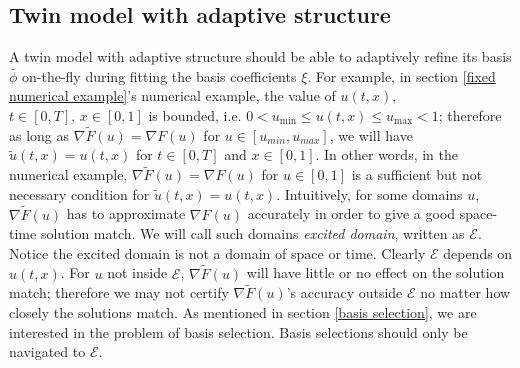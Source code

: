 \documentclass[a4paper,onecolumn]{article}
\theoremstyle{remark}
\begin{document}
\subsection{Twin model with adaptive structure}
\label{adaptive}
A twin model with adaptive structure should be able to adaptively
refine its basis $\bar{\phi}$ on-the-fly during fitting the basis coefficients $\xi$.
For example, in section \ref{fixed numerical example}'s numerical example,
the value of $u(t,x)$, $t\in[0,T],\,x\in[0,1]$ is bounded, i.e.
$0< u_{\min}\le u(t,x)\le u_{\max} < 1$; therefore as long as 
$\nabla\tilde{F}(u) = \nabla F(u)$ for $u\in[u_{min},u_{max}]$, we will have
$\tilde{u}(t,x) = u(t,x)$ for $t\in[0,T]$ and $x\in[0,1]$.
In other words, in the numerical example, $\nabla \tilde{F}(u) = \nabla F(u)$ for $u\in [0,1]$
is a sufficient but not necessary condition
for $\tilde{u}(t,x) = u(t,x)$. 
Intuitively, for some domains $u$, $\nabla \tilde{F}(u)$ has to approximate $\nabla F(u)$
accurately in order to give a good space-time solution match.
We will call such domains \emph{excited domain}, written as $\mathcal{E}$. 
Notice the excited domain is not a domain of space or time.  
Clearly $\mathcal{E}$ depends on $u(t,x)$.
For $u$ not inside $\mathcal{E}$,
$\nabla \tilde{F}(u)$ will have little or no effect on the solution match; therefore
we may not certify $\nabla \tilde{F}(u)$'s accuracy outside $\mathcal{E}$
no matter how closely the solutions match.
As mentioned in section \ref{basis selection}, we are interested in the problem of basis
selection. Basis selections should only be navigated to $\mathcal{E}$.\\
\end{document}
